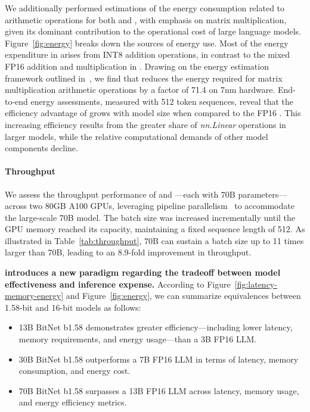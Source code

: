 We additionally performed estimations of the energy consumption related to arithmetic operations for both  and , with emphasis on matrix multiplication, given its dominant contribution to the operational cost of large language models. Figure~\ref{fig:energy} breaks down the sources of energy use. Most of the energy expenditure in  arises from INT8 addition operations, in contrast to the mixed FP16 addition and multiplication in . Drawing on the energy estimation framework outlined in~\cite{energycost, pokebnn}, we find that  reduces the energy required for matrix multiplication arithmetic operations by a factor of 71.4 on 7nm hardware. End-to-end energy assessments, measured with 512 token sequences, reveal that the efficiency advantage of  grows with model size when compared to the FP16 . This increasing efficiency results from the greater share of \emph{nn.Linear} operations in larger models, while the relative computational demands of other model components decline.

\paragraph{Throughput}

We assess the throughput performance of  and —each with 70B parameters—across two 80GB A100 GPUs, leveraging pipeline parallelism~\cite{gpipe} to accommodate the large-scale  70B model. The batch size was increased incrementally until the GPU memory reached its capacity, maintaining a fixed sequence length of 512. As illustrated in Table~\ref{tab:throughput},  70B can sustain a batch size up to 11 times larger than  70B, leading to an 8.9-fold improvement in throughput.

\textbf{ introduces a new paradigm regarding the tradeoff between model effectiveness and inference expense.} According to Figure~\ref{fig:latency-memory-energy} and Figure~\ref{fig:energy}, we can summarize equivalences between 1.58-bit and 16-bit models as follows:

\begin{itemize}
    \item 13B BitNet b1.58 demonstrates greater efficiency—including lower latency, memory requirements, and energy usage—than a 3B FP16 LLM.
    \item 30B BitNet b1.58 outperforms a 7B FP16 LLM in terms of latency, memory consumption, and energy cost.
    \item 70B BitNet b1.58 surpasses a 13B FP16 LLM across latency, memory usage, and energy efficiency metrics.
\end{itemize}


